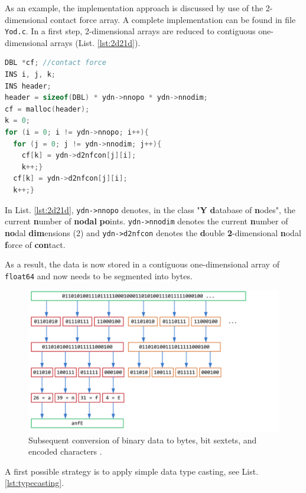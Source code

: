 \bigbreak
As an example, the implementation approach is discussed by use of the 2-dimensional contact force array. A complete implementation can be found in file \lstinline{Yod.c}. In a first step, 2-dimensional arrays are reduced to contiguous one-dimensional arrays (List. \ref{lst:2d21d}).

\begin{lstlisting}[language=C, caption=Converting 2-dimensional array to 1-dimensional array for contiguity, label=lst:2d21d]
DBL *cf; //contact force
INS i, j, k;
INS header;
header = sizeof(DBL) * ydn->nnopo * ydn->nnodim;
cf = malloc(header);
k = 0;
for (i = 0; i != ydn->nnopo; i++){
  for (j = 0; j != ydn->nnodim; j++){
    cf[k] = ydn->d2nfcon[j][i];
    k++;}
  cf[k] = ydn->d2nfcon[j][i];
  k++;}
\end{lstlisting}

In List. \ref{lst:2d21d}, \lstinline{ydn->nnopo} denotes, in the class "\textbf{Y} \textbf{d}atabase of \textbf{n}odes", the current \textbf{n}umber of \textbf{nodal} \textbf{po}ints. \lstinline{ydn->nnodim} denotes the current \textbf{n}umber of \textbf{no}dal \textbf{dim}ensions (2) and \lstinline{ydn->d2nfcon} denotes the \textbf{d}ouble \textbf{2}-dimensional \textbf{n}odal \textbf{f}orce of \textbf{con}tact. 

\bigbreak
As a result, the data is now stored in a contiguous one-dimensional array of \lstinline{float64} and now needs to be segmented into bytes.
\begin{figure}[!htbp]
    \centering
    \includegraphics[width=\columnwidth]{b64}
    \caption{Subsequent conversion of binary data to bytes, bit sextets, and encoded characters \cite{App}.}
    \label{fig:b64}
\end{figure}

A first possible strategy is to apply simple data type casting, see List. \ref{lst:typecasting}.

